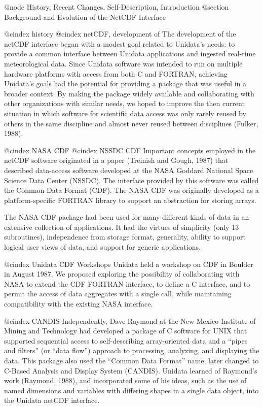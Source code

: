 @node History, Recent Changes, Self-Description, Introduction
@section Background and Evolution of the NetCDF Interface

@cindex history
@cindex netCDF, development of
The development of the netCDF interface began with a modest goal related to
Unidata's needs: to provide a common interface between Unidata
applications and ingested real-time meteorological data.  Since Unidata
software was intended to run on multiple hardware platforms with access
from both C and FORTRAN, achieving Unidata's goals had the
potential for providing a package that was useful in a broader context.
By making the package widely available and collaborating with other
organizations with similar needs, we hoped to improve the then current
situation in which software for scientific data access was only rarely reused by others
in the same discipline and almost never reused between disciplines
(Fulker, 1988).

@cindex NASA CDF
@cindex NSSDC CDF
Important concepts employed in the netCDF software originated in a paper
(Treinish and Gough, 1987) that described data-access software developed
at the NASA Goddard National Space Science Data Center (NSSDC).  The
interface provided by this software was called the Common Data Format
(CDF).  The NASA CDF was originally developed as a platform-specific
FORTRAN library to support an abstraction for storing arrays.

The NASA CDF package had been used for many different kinds
of data in an extensive collection of applications.  It
had the virtues of simplicity (only 13 subroutines), independence from
storage format, generality, ability to support logical user views of
data, and support for generic applications.

@cindex Unidata CDF Workshops
Unidata held a workshop on CDF in Boulder in August 1987.  We proposed
exploring the possibility of collaborating with NASA to extend the CDF
FORTRAN interface, to define a C interface, and to permit the access of
data aggregates with a single call, while maintaining compatibility with
the existing NASA interface.

@cindex CANDIS
Independently, Dave Raymond at the New Mexico Institute of Mining and
Technology had developed a package of C software for UNIX that supported
sequential access to self-describing array-oriented data
and a ``pipes and filters'' (or ``data flow'')
approach to processing, analyzing, and displaying the data.
This package also used the ``Common Data Format'' name,
later changed to C-Based Analysis and Display System (CANDIS).
Unidata learned of Raymond's work (Raymond, 1988), and
incorporated some of his ideas, such as the use of named dimensions and
variables with differing shapes in a single data object, into the
Unidata netCDF interface.

